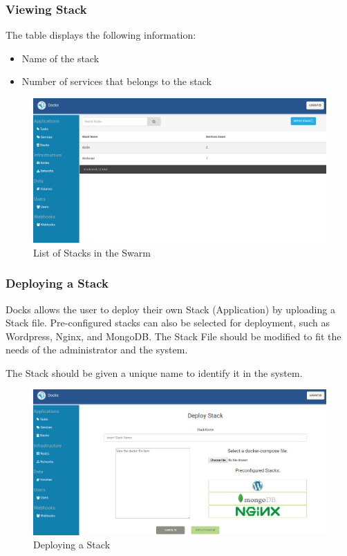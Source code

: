 \documentclass[]{article}
\providecommand{\tightlist}{%
	\setlength{\itemsep}{0pt}\setlength{\parskip}{0pt}}
\begin{document}
\subsubsection{Viewing Stack}
The table displays the following information:
\begin{itemize}
	\tightlist
	\item Name of the stack
	\item Number of services that belongs to the stack 
\end{itemize}

\begin{figure}[H]
	\centering
	\includegraphics[scale=0.4]{stacks.png}
	\caption{List of Stacks in the Swarm}
\end{figure}

\subsubsection{Deploying a Stack}
Docks allows the user to deploy their own Stack (Application) by uploading
a Stack file. Pre-configured stacks can also be selected for deployment,
such as Wordpress, Nginx, and MongoDB. The Stack File should be modified
to fit the needs of the administrator and the system.

The Stack should be given a unique name to identify it in the system.

\begin{figure}[H]
	\centering
	\includegraphics[scale=0.4]{stacks_deploy.png}
	\caption{Deploying a Stack}
\end{figure}
\end{document}
